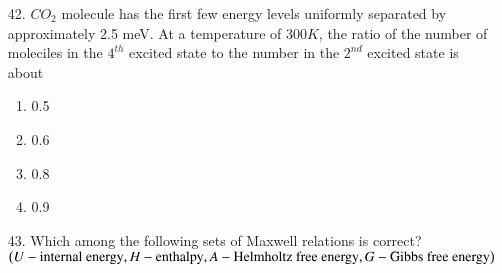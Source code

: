 \documentclass[journal,12pt,onecolumn]{IEEEtran}
\theoremstyle{remark}
\begin{document}
\begin{enumerate}
\begin{enumerate}
            \end{enumerate}

        \item[42.] $CO_2$ molecule has the first few energy levels uniformly separated by approximately
            2.5 meV. At a temperature of $300K$, the ratio of the number of moleciles in the $4^{th}$
            excited state to the number in the $2^{nd}$ excited state is about 
            \hfill{}
            \begin{enumerate}
                \item 0.5
                \item 0.6
                \item 0.8
                \item 0.9
            \end{enumerate}

        \item[43.] Which among the following sets of Maxwell relations is correct? $\left(U -
            \textnormal{internal energy},\\ H - \textnormal{enthalpy}, A - \textnormal{Helmholtz free energy},
            G - \textnormal{Gibbs free energy}\right)$ 


\end{enumerate}
\end{document}
